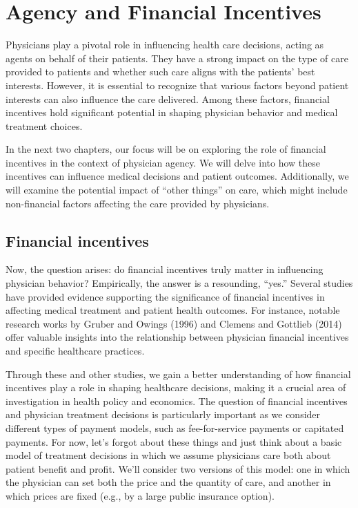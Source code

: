 \documentclass[
  letterpaper,
  DIV=11,
  numbers=noendperiod]{scrreport}
\theoremstyle{definition}
\theoremstyle{remark}
\begin{document}
\hypertarget{agency-and-financial-incentives}{%
\chapter{Agency and Financial
Incentives}\label{agency-and-financial-incentives}}

Physicians play a pivotal role in influencing health care decisions,
acting as agents on behalf of their patients. They have a strong impact
on the type of care provided to patients and whether such care aligns
with the patients' best interests. However, it is essential to recognize
that various factors beyond patient interests can also influence the
care delivered. Among these factors, financial incentives hold
significant potential in shaping physician behavior and medical
treatment choices.

In the next two chapters, our focus will be on exploring the role of
financial incentives in the context of physician agency. We will delve
into how these incentives can influence medical decisions and patient
outcomes. Additionally, we will examine the potential impact of ``other
things'' on care, which might include non-financial factors affecting
the care provided by physicians.

\hypertarget{financial-incentives}{%
\section{Financial incentives}\label{financial-incentives}}

Now, the question arises: do financial incentives truly matter in
influencing physician behavior? Empirically, the answer is a resounding,
``yes.'' Several studies have provided evidence supporting the
significance of financial incentives in affecting medical treatment and
patient health outcomes. For instance, notable research works by Gruber
and Owings (1996) and Clemens and Gottlieb (2014) offer valuable
insights into the relationship between physician financial incentives
and specific healthcare practices.

Through these and other studies, we gain a better understanding of how
financial incentives play a role in shaping healthcare decisions, making
it a crucial area of investigation in health policy and economics. The
question of financial incentives and physician treatment decisions is
particularly important as we consider different types of payment models,
such as fee-for-service payments or capitated payments. For now, let's
forgot about these things and just think about a basic model of
treatment decisions in which we assume physicians care both about
patient benefit and profit. We'll consider two versions of this model:
one in which the physician can set both the price and the quantity of
care, and another in which prices are fixed (e.g., by a large public
insurance option).
\end{document}
